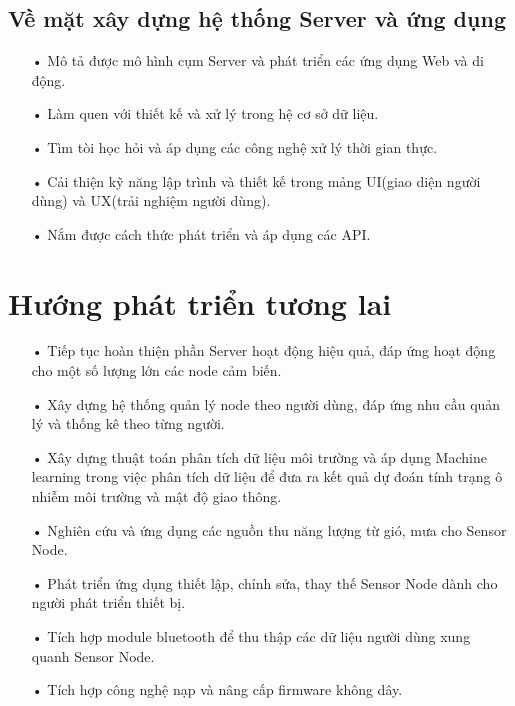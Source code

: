 \subsection{Về mặt xây dựng hệ thống Server và ứng dụng}
\begin{itemize}
	\item[•] Mô tả được mô hình cụm Server và phát triển các ứng dụng Web và di động.
	\item[•] Làm quen với thiết kế và xử lý trong hệ cơ sở dữ liệu.
	\item[•] Tìm tòi học hỏi và áp dụng các công nghệ xử lý thời gian thực.
	\item[•] Cải thiện kỹ năng lập trình và thiết kế trong mảng UI(giao diện người dùng) và UX(trải nghiệm người dùng).
	\item[•] Nắm được cách thức phát triển và áp dụng các API.
\end{itemize}
\section{Hướng phát triển tương lai}
\begin{itemize}
\item[•] Tiếp tục hoàn thiện phần Server hoạt động hiệu quả, đáp ứng hoạt động cho một số lượng lớn các node cảm biến.
\item[•] Xây dựng hệ thống quản lý node theo người dùng, đáp ứng nhu cầu quản lý và thống kê theo từng người.
\item[•] Xây dựng thuật toán phân tích dữ liệu môi trường và áp dụng Machine learning trong việc phân tích dữ liệu để đưa ra kết quả dự đoán tính trạng ô nhiễm môi trường và mật độ giao thông.
\item[•] Nghiên cứu và ứng dụng các nguồn thu năng lượng từ gió, mưa cho Sensor Node.
\item[•] Phát triển ứng dụng thiết lập, chỉnh sửa, thay thế Sensor Node dành cho người phát triển thiết bị.
\item[•] Tích hợp module bluetooth để thu thập các dữ liệu người dùng xung quanh Sensor Node.
\item[•] Tích hợp công nghệ nạp và nâng cấp firmware không dây.
\end{itemize}
